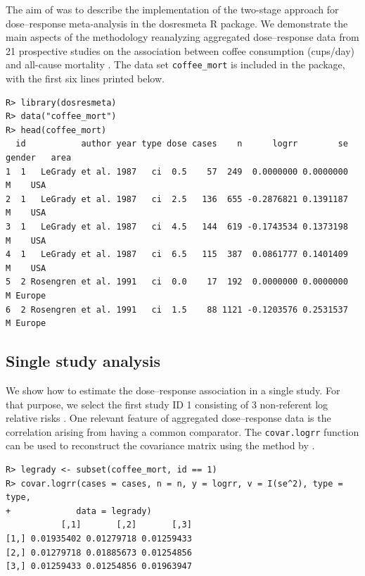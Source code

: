 \documentclass[11pt,a4paper,twoside,openany]{book}\usepackage{knitr}
\newcommand{\pkg}[1]{{\fontseries{b}\selectfont #1}}
\begin{document}
{The aim of  was to describe the implementation of the two-stage approach for dose--response meta-analysis in the \pkg{dosresmeta} \textsf{R} package.
We demonstrate the main aspects of the methodology reanalyzing aggregated dose--response data from 21 prospective studies on the association between coffee consumption (cups/day) and all-cause mortality \citep{crippa2014coffee}. The data set \texttt{coffee\_mort} is included in the package, with the first six lines printed below.

\begin{knitrout}\footnotesize
{}\color{fgcolor}\begin{kframe}
\begin{verbatim}
R> library(dosresmeta)
R> data("coffee_mort")
R> head(coffee_mort)
  id           author year type dose cases    n      logrr        se gender   area
1  1   LeGrady et al. 1987   ci  0.5    57  249  0.0000000 0.0000000      M    USA
2  1   LeGrady et al. 1987   ci  2.5   136  655 -0.2876821 0.1391187      M    USA
3  1   LeGrady et al. 1987   ci  4.5   144  619 -0.1743534 0.1373198      M    USA
4  1   LeGrady et al. 1987   ci  6.5   115  387  0.0861777 0.1401409      M    USA
5  2 Rosengren et al. 1991   ci  0.0    17  192  0.0000000 0.0000000      M Europe
6  2 Rosengren et al. 1991   ci  1.5    88 1121 -0.1203576 0.2531537      M Europe
\end{verbatim}
\end{kframe}
\end{knitrout}

\subsection{Single study analysis}

\noindent We show how to estimate the dose--response association in a single study. For that purpose, we select the first study ID 1 consisting of 3 non-referent log relative risks \citep{legrady1987coffee}. One relevant feature of aggregated dose--response data is the correlation arising from having a common comparator. The \texttt{covar.logrr} function can be used to reconstruct the covariance matrix using the method by \cite{greenland1992methods}.

\begin{knitrout}\footnotesize
{}\color{fgcolor}\begin{kframe}
\begin{verbatim}
R> legrady <- subset(coffee_mort, id == 1)
R> covar.logrr(cases = cases, n = n, y = logrr, v = I(se^2), type = type, 
+             data = legrady)
           [,1]       [,2]       [,3]
[1,] 0.01935402 0.01279718 0.01259433
[2,] 0.01279718 0.01885673 0.01254856
[3,] 0.01259433 0.01254856 0.01963947
\end{verbatim}
\end{kframe}
\end{knitrout}

}
\end{document}
